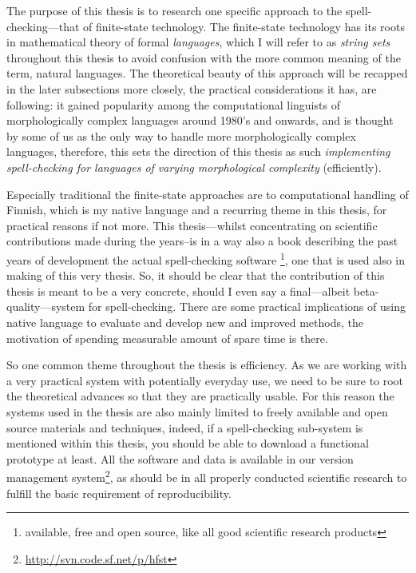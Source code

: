 \documentclass[officiallayout]{unihelcompling}
\begin{document}
The purpose of this thesis is to research one specific approach to the
spell-checking---that of finite-state technology. The finite-state technology
has its roots in mathematical theory of formal \emph{languages}, which I will
refer to as \emph{string sets} throughout this thesis to avoid confusion with
the more common meaning of the term, natural languages. The theoretical beauty
of this approach will be recapped in the later subsections more closely, the
practical considerations it has, are following: it gained popularity among the
computational linguists of morphologically complex languages around 1980's and
onwards, and is thought by some of us as the only way to handle more
morphologically complex languages, therefore, this sets the direction of this
thesis as such \emph{implementing spell-checking for languages of varying
morphological complexity} (efficiently). 

Especially traditional the finite-state approaches are to computational
handling of Finnish, which is my native language and a recurring theme in this
thesis, for practical reasons if not more. This thesis---whilst concentrating
on scientific contributions made during the years--is in a way also a book
describing the past years of development the actual spell-checking software
\footnote{available, free and open source, like all good scientific research
products}, one that is used also in making of this very thesis. So, it should
be clear that the contribution of this thesis is meant to be a very concrete,
should I even say a final---albeit beta-quality---system for spell-checking.
There are some practical implications of using native language to evaluate and
develop new and improved methods, the motivation of spending measurable amount
of spare time is there.

So one common theme throughout the thesis is efficiency. As we are working with
a very practical system with potentially everyday use, we need to be sure to
root the theoretical advances so that they are practically usable. For this
reason the systems used in the thesis are also mainly limited to freely
available and open source materials and techniques, indeed, if a spell-checking
sub-system is mentioned within this thesis, you should be able to download a
functional prototype at least. All the software and data is available in our
version management system\footnote{\url{http://svn.code.sf.net/p/hfst}}, as
should be in all properly conducted scientific research to fulfill the basic
requirement of reproducibility.
\end{document}
